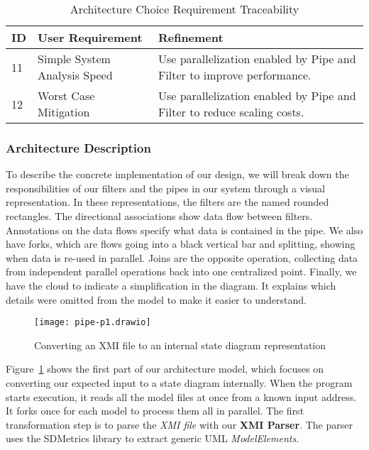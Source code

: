 \begin{table}[htbp]
    \centering
    \caption{Architecture Choice Requirement Traceability}\label{tab:arch-choice-table}
    \begin{tabularx}{\textwidth}{| l | l | X |}
        \hline
        \textbf{ID} & \textbf{User Requirement} & \textbf{Refinement} \\
        \hline
        11 & Simple System Analysis Speed & Use parallelization enabled by Pipe and Filter to improve performance. \\ \hline
        12 & Worst Case Mitigation & Use parallelization enabled by Pipe and Filter to reduce scaling costs.  \\ \hline
    \end{tabularx}
\end{table}

\newpage
\subsubsection{Architecture Description}\label{subsubsec:arch-desc}
To describe the concrete implementation of our design,
we will break down the responsibilities of our filters and the pipes in our system through a visual representation.
In these representations, the filters are the named rounded rectangles.
The directional associations show data flow between filters.
Annotations on the data flows specify what data is contained in the pipe.
We also have forks, which are flows going into a black vertical bar and splitting, showing when data is re-used in parallel.
Joins are the opposite operation, collecting data from independent parallel operations back into one centralized point.
Finally, we have the cloud to indicate a simplification in the diagram.
It explains which details were omitted from the model to make it easier to understand.

\begin{figure}[ht]
    \centering
    \texttt{[image: pipe-p1.drawio]}
    \caption{Converting an XMI file to an internal state diagram representation}
    \label{fig:pipe-1}
\end{figure}

Figure~\ref{fig:pipe-1} shows the first part of our architecture model, which focuses on converting our expected input to a state diagram internally.
When the program starts execution, it reads all the model files at once from a known input address.
It forks once for each model to process them all in parallel.
The first transformation step is to parse the \textit{XMI file} with our \textbf{XMI Parser}.
The parser uses the SDMetrics library to extract generic UML \textit{ModelElements}.

